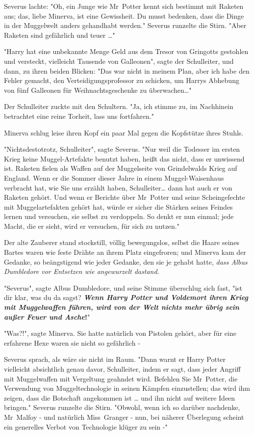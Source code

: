{Severus lachte: "Oh, ein Junge wie Mr~Potter kennt sich bestimmt mit Raketen aus; das, liebe Minerva, ist eine Gewissheit. Du musst bedenken, dass die Dinge in der Muggelwelt anders gehandhabt werden." Severus runzelte die Stirn. "Aber Raketen sind gefährlich und teuer …"

"Harry hat eine unbekannte Menge Geld aus dem Tresor von Gringotts gestohlen und versteckt, vielleicht Tausende von Galleonen", sagte der Schulleiter, und dann, zu ihren beiden Blicken: "Das war nicht in meinem Plan, aber ich habe den Fehler gemacht, den Verteidigungsprofessor zu schicken, um Harrys Abhebung von fünf Galleonen für Weihnachtsgeschenke zu überwachen…"

Der Schulleiter zuckte mit den Schultern. "Ja, ich stimme zu, im Nachhinein betrachtet eine reine Torheit, lass uns fortfahren."

Minerva schlug leise ihren Kopf ein paar Mal gegen die Kopfstütze ihres Stuhls.

"Nichtsdestotrotz, Schulleiter", sagte Severus. "Nur weil die Todesser im ersten Krieg keine Muggel-Artefakte benutzt haben, heißt das nicht, dass er unwissend ist. Raketen fielen als Waffen auf der Muggelseite von Grindelwalds Krieg auf England. Wenn er die Sommer dieser Jahre in einem Muggel-Waisenhaus verbracht hat, wie Sie uns erzählt haben, Schulleiter… dann hat auch er von Raketen gehört. Und wenn er Berichte über Mr~Potter und seine Scheingefechte mit Muggelartefakten gehört hat, würde er sicher die Stärken seines Feindes lernen und versuchen, sie selbst zu verdoppeln. So denkt er nun einmal; jede Macht, die er sieht, wird er versuchen, für sich zu nutzen."

Der alte Zauberer stand stockstill, völlig bewegungslos, selbst die Haare seines Bartes waren wie feste Drähte an ihrem Platz eingefroren; und Minerva kam der Gedanke, so beängstigend wie jeder Gedanke, den sie je gehabt hatte, \emph{dass Albus Dumbledore vor Entsetzen wie angewurzelt dastand.}

"Severus", sagte Albus Dumbledore, und seine Stimme überschlug sich fast, "ist dir klar, was du da sagst? \textbf{\emph{Wenn Harry Potter und Voldemort ihren Krieg mit Muggelwaffen führen, wird von der Welt nichts mehr übrig sein außer Feuer und Asche}!}"

"Was?!", sagte Minerva. Sie hatte natürlich von Pistolen gehört, aber für eine erfahrene Hexe waren sie nicht so gefährlich -

Severus sprach, als wäre sie nicht im Raum. "Dann warnt er Harry Potter vielleicht absichtlich genau davor, Schulleiter, indem er sagt, dass jeder Angriff mit Muggelwaffen mit Vergeltung geahndet wird. Befehlen Sie Mr~Potter, die Verwendung von Muggeltechnologie in seinen Kämpfen einzustellen; das wird ihm zeigen, dass die Botschaft angekommen ist … und ihn nicht auf weitere Ideen bringen." Severus runzelte die Stirn. "Obwohl, wenn ich so darüber nachdenke, Mr~Malfoy - und natürlich Miss~Granger - nun, bei näherer Überlegung scheint ein generelles Verbot von Technologie klüger zu sein -"

}
